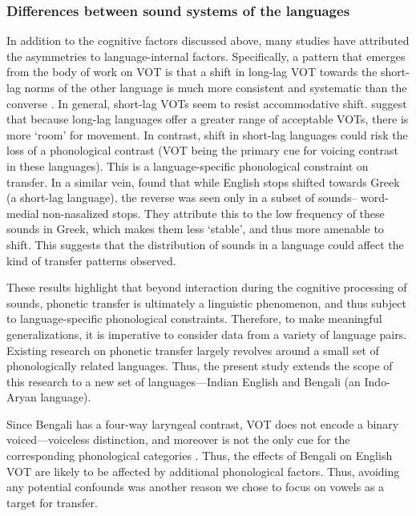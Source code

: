 \documentclass[charis,linguex]{glossa}
\begin{document}
\subsubsection{Differences between sound systems of the languages} \label{sound systems} In addition to the cognitive factors discussed above, many studies have attributed the asymmetries to language-internal factors. Specifically, a pattern that emerges from the body of work on VOT is that a shift in long-lag VOT towards the short-lag norms of the other language is much more consistent and systematic than the converse \cite{tobin2017phonetic, olson2016role,bullock2009trying,antoniou2011inter,chang2012rapid}. In general, short-lag VOTs seem to resist accommodative shift. \cite{bullock2009trying} suggest that because long-lag languages offer a greater range of acceptable VOTs, there is more `room' for movement. In contrast, shift in short-lag languages could risk the loss of a phonological contrast (VOT being the primary cue for voicing contrast in these languages).  This is a language-specific phonological constraint on transfer.
In a similar vein, \cite{antoniou2011inter} found that while English stops shifted towards Greek (a short-lag language), the reverse was seen only in a subset of sounds-- word-medial non-nasalized stops. They attribute this to the low frequency of these sounds in Greek, which makes them less `stable', and thus more amenable to shift. This suggests that the distribution of sounds in a language could affect the kind of transfer patterns observed.

These results highlight that beyond interaction during the cognitive processing of sounds, phonetic transfer is ultimately a linguistic phenomenon, and thus subject to language-specific phonological constraints. Therefore, to make meaningful generalizations, it is imperative to consider data from a variety of language pairs. Existing research on phonetic transfer largely revolves around a small set of phonologically related languages. Thus, the present study extends the scope of this research to a new set of languages---Indian English and Bengali (an Indo-Aryan language).

Since Bengali has a four-way laryngeal contrast, VOT does not encode a binary voiced---voiceless distinction, and moreover is not the only cue for the corresponding phonological categories \citep{dmitrieva2020acoustic}. Thus, the effects of Bengali on English VOT are likely to be affected by additional phonological factors. Thus, avoiding any potential confounds was another reason we chose to focus on vowels as a target for transfer. 
\end{document}
